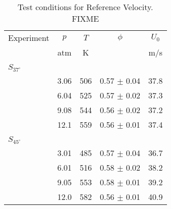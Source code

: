 \begin{table}
  \caption[Test conditions for Pressure]{Test conditions for Reference Velocity. FIXME}
  \begin{center}
    \begin{tabular}{lcccc}
      Experiment & \(p\) & \(T\) & \(\phi\) & \(U_0\) \tabularnewline
      & atm & K & & m/s \tabularnewline
      \hline\hline
      & & & & \tabularnewline
      \(S_{37^\circ}\) & & & & \tabularnewline
      \hline
      & 3.06 & 506 & 0.57 \(\pm\) 0.04 & 37.8 \tabularnewline
      & 6.04 & 525 & 0.57 \(\pm\) 0.02 & 37.3 \tabularnewline
      & 9.08 & 544 & 0.56 \(\pm\) 0.02 & 37.2 \tabularnewline
      & 12.1 & 559 & 0.56 \(\pm\) 0.01 & 37.4 \tabularnewline
      & & & & \tabularnewline
      \(S_{45^\circ}\) & & & & \tabularnewline
      \hline
      & 3.01 & 485 & 0.57 \(\pm\) 0.04 & 36.7 \tabularnewline
      & 6.01 & 516 & 0.58 \(\pm\) 0.02 & 38.2 \tabularnewline
      & 9.05 & 553 & 0.58 \(\pm\) 0.01 & 39.2 \tabularnewline
      & 12.0 & 582 & 0.56 \(\pm\) 0.01 & 40.9 \tabularnewline
      \hline
    \end{tabular}
  \end{center}
  \label{tab:pressureCases}
\end{table}

